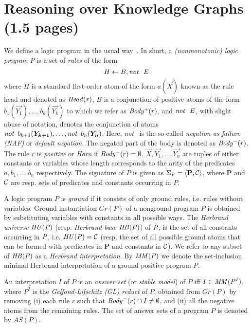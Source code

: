 \section{Reasoning over Knowledge Graphs (1.5 pages)}
\label{sec:reasoning}


 
We define a logic program in the usual way~\cite{DBLP:books/sp/Lloyd87}. 
In short, a \emph{(nonmonotonic) logic program} $P$ is a set of \emph{rules} of the form
\begin{equation}
H\leftarrow B, \mathit{not}~ \ E
\end{equation}
 where $H$ is a standard first-order atom of the form $a(\vec{X})$ known as the rule head and denoted as $\mathit{Head(r)}$, $B$ is a conjunction of positive atoms of the form $b_1(\vec{Y_1}),\dotsc,b_k(\vec{Y_k})$  to which we refer as $\mathit{Body^+}(r)$, and $\mathit{not}~ \ E$, with slight abuse of notation, denotes the conjunction of atoms $\naf\, b_{k+1}(\vec{Y_{k+1}}),\dotsc,\naf\, b_n(\vec{Y_{n}})$. Here, $\naf$ is the so-called \emph{negation as failure (NAF)} or \emph{default negation}. The negated part of the body is denoted as $\mathit{Body^-}(r)$.  The rule $r$ is \emph{positive} or
\emph{Horn} if $\mathit{Body^-}(r)=\emptyset$.
 $\vec{X},\vec{Y_1},\ldots,\vec{Y_{n}}$ are tuples of either constants or
variables whose length corresponds to the arity of the predicates
$a,b_1,\ldots,b_n$ respectively. The signature of $P$ is given as $\Sigma_{\mathit{P}}=\langle\mathbf{P},\mathcal{C}\rangle$, where $\mathbf{P}$ and $\mathcal{C}$ are resp. sets of predicates and constants occurring in $P$.


A logic program $P$ is \emph{ground} if it consists of only ground rules, i.e. rules without
variables. Ground instantiation $Gr(P)$ of a nonground program $P$ is obtained by substituting variables with constants in all possible ways. The \emph{Herbrand universe}  $\mathit{HU(P)}$ (resp. \emph{Herbrand base} $\mathit{HB(P)}$) of $\mathit{P}$, is the set of all constants occurring in $\mathit{P}$, i.e.  $\mathit{HU(P)}=\mathcal{C}$ (resp.
the set of all possible ground atoms that can be formed with predicates in $\mathbf{P}$
and constants in $\mathcal{C}$). We refer to any subset of $\mathit{HB(P)}$ as a \emph{Herbrand interpretation}. By $\mathit{MM(P)}$ we denote the set-inclusion minimal Herbrand interpretation of a ground positive program $P$.


An interpretation $I$ of $P$ is an \emph{answer set} (or \emph{stable model}) of $P$ iff $I \in \mathit{MM}(P^I)$, where $P^I$ is the \emph{Gelfond-Lifschitz (GL) reduct} \cite{GL1988} of $P$, obtained from $Gr(P)$ by removing (i) each rule $r$ such that $\mathit{Body}^-(r) \cap I\neq\emptyset$, and (ii) all the negative atoms from the remaining rules. The set of answer sets of a program $P$ is denoted by $AS(P)$.

